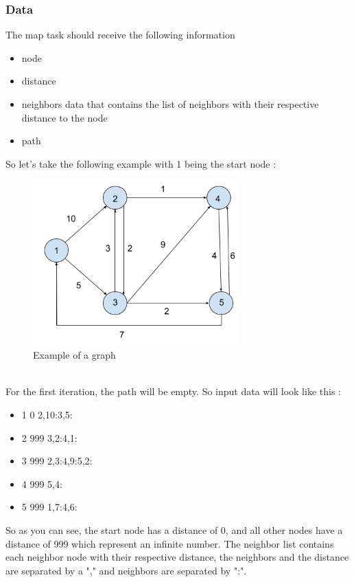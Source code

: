 \documentclass[english]{article}
\begin{document}
\subsubsection{Data}
The map task should receive the following information
\begin{itemize}
\item node
\item distance
\item neighbors data that contains the list of neighbors with their respective distance to the node
\item path
\end{itemize}
So let's take the following example with 1 being the start node :
\begin{figure}[h]
\centering
\includegraphics[width=8cm]{img/data-example.png}
\caption{Example of a graph}
\end{figure}
\\
For the first iteration, the path will be empty. So input data will look like this :
\begin{itemize}
\item 1 0 2,10:3,5:
\item 2 999 3,2:4,1:
\item 3 999 2,3:4,9:5,2: 
\item 4 999 5,4:
\item 5 999 1,7:4,6:
\end{itemize}
So as you can see, the start node has a distance of 0, and all other nodes have a distance of 999 which represent an infinite number. The neighbor list contains each neighbor node with their respective distance, the neighbors and the distance are separated by a "," and neighbors are separated by ":".
\end{document}
